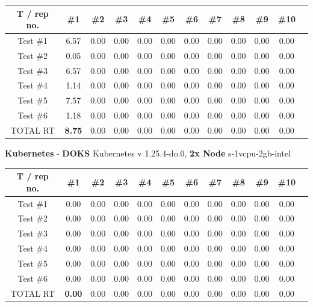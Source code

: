 \begin{tabular}{ |c|c|c|c|c|c|c|c|c|c|c|c| } 
    \hline
    T / rep no. & \#1 & \#2& \#3& \#4& \#5& \#6& \#7& \#8& \#9& \#10 \\
    \hline
    Test \#1 & 6.57 & 0.00& 0.00& 0.00& 0.00& 0.00& 0.00& 0.00& 0.00& 0.00 \\ 
    Test \#2 & 0.05 & 0.00& 0.00& 0.00& 0.00& 0.00& 0.00& 0.00& 0.00& 0.00 \\ 
    Test \#3 & 6.57 & 0.00& 0.00& 0.00& 0.00& 0.00& 0.00& 0.00& 0.00& 0.00 \\ 
    Test \#4 & 1.14 & 0.00& 0.00& 0.00& 0.00& 0.00& 0.00& 0.00& 0.00& 0.00 \\ 
    Test \#5 & 7.57 & 0.00& 0.00& 0.00& 0.00& 0.00& 0.00& 0.00& 0.00& 0.00 \\ 
    Test \#6 & 1.18 & 0.00& 0.00& 0.00& 0.00& 0.00& 0.00& 0.00& 0.00& 0.00 \\ 
    TOTAL RT & \textbf{8.75} & 0.00& 0.00& 0.00& 0.00& 0.00& 0.00& 0.00& 0.00& 0.00 \\ 
    \hline
\end{tabular}
\newline
\textbf{Kubernetes} - \textbf{DOKS} Kubernetes v 1.25.4-do.0, \textbf{2x Node} s-1vcpu-2gb-intel
\newline
\begin{tabular}{ |c|c|c|c|c|c|c|c|c|c|c|c| } 
    \hline
    T / rep no. & \#1 & \#2& \#3& \#4& \#5& \#6& \#7& \#8& \#9& \#10 \\
    \hline
    Test \#1 & 0.00 & 0.00& 0.00& 0.00& 0.00& 0.00& 0.00& 0.00& 0.00& 0.00 \\ 
    Test \#2 & 0.00 & 0.00& 0.00& 0.00& 0.00& 0.00& 0.00& 0.00& 0.00& 0.00 \\ 
    Test \#3 & 0.00 & 0.00& 0.00& 0.00& 0.00& 0.00& 0.00& 0.00& 0.00& 0.00 \\ 
    Test \#4 & 0.00 & 0.00& 0.00& 0.00& 0.00& 0.00& 0.00& 0.00& 0.00& 0.00 \\ 
    Test \#5 & 0.00 & 0.00& 0.00& 0.00& 0.00& 0.00& 0.00& 0.00& 0.00& 0.00 \\ 
    Test \#6 & 0.00 & 0.00& 0.00& 0.00& 0.00& 0.00& 0.00& 0.00& 0.00& 0.00 \\ 
    TOTAL RT & \textbf{0.00} & 0.00& 0.00& 0.00& 0.00& 0.00& 0.00& 0.00& 0.00& 0.00 \\ 
    \hline
\end{tabular}
